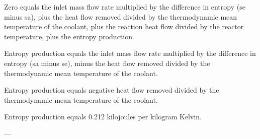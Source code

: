 Zero equals the inlet mass flow rate multiplied by the difference in entropy (se minus sa), plus the heat flow removed divided by the thermodynamic mean temperature of the coolant, plus the reaction heat flow divided by the reactor temperature, plus the entropy production.  

Entropy production equals the inlet mass flow rate multiplied by the difference in entropy (sa minus se), minus the heat flow removed divided by the thermodynamic mean temperature of the coolant.  

Entropy production equals negative heat flow removed divided by the thermodynamic mean temperature of the coolant.  

Entropy production equals 0.212 kilojoules per kilogram Kelvin.  

---